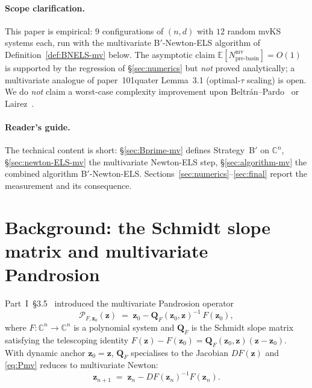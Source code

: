 \documentclass[11pt,a4paper]{article}
\begin{document}
\begin{abstract}
We do \emph{not} claim a complexity-theoretic improvement upon Beltr\'an--Pardo or Lairez (who together resolve Smale~17). The contribution is to verify empirically that the multivariate Pandrosion-Newton scheme of Part~I §3.5 attains $O(D \log D)$ on mvKS, and to clarify that this is a property of the multivariate Newton step itself, not of the ELS modification.
\end{abstract}

\paragraph{Scope clarification.} This paper is empirical: $9$ configurations of $(n, d)$ with $12$ random mvKS systems each, run with the multivariate B$'$-Newton-ELS algorithm of Definition~\ref{def:BNELS-mv} below. The asymptotic claim $\mathbb{E}[N_{\text{pre-basin}}^{\text{mv}}] = O(1)$ is supported by the regression of \S\ref{sec:numerics} but \emph{not} proved analytically; a multivariate analogue of paper~101quater Lemma~3.1 (optimal-$\tau$ scaling) is open. We do \emph{not} claim a worst-case complexity improvement upon Beltr\'an--Pardo~\cite{beltranpardo} or Lairez~\cite{lairez}.

\paragraph{Reader's guide.}
The technical content is short: \S\ref{sec:Bprime-mv} defines Strategy~B$'$ on $\mathbb{C}^n$, \S\ref{sec:newton-ELS-mv} the multivariate Newton-ELS step, \S\ref{sec:algorithm-mv} the combined algorithm B$'$-Newton-ELS. Sections~\ref{sec:numerics}--\ref{sec:final} report the measurement and its consequence.

\tableofcontents

\section{Background: the Schmidt slope matrix and multivariate Pandrosion}\label{sec:background}

Part~I~\S3.5~\cite{besevic1} introduced the multivariate Pandrosion operator
\begin{equation}\label{eq:Pmv}
\mathcal{P}_{F, \mathbf{z}_0}(\mathbf{z}) \;=\; \mathbf{z}_0 - \mathbf{Q}_F(\mathbf{z}_0, \mathbf{z})^{-1}\, F(\mathbf{z}_0),
\end{equation}
where $F: \mathbb{C}^n \to \mathbb{C}^n$ is a polynomial system and $\mathbf{Q}_F$ is the Schmidt slope matrix~\cite{schmidt1963} satisfying the telescoping identity $F(\mathbf{z}) - F(\mathbf{z}_0) = \mathbf{Q}_F(\mathbf{z}_0, \mathbf{z})(\mathbf{z} - \mathbf{z}_0)$. With dynamic anchor $\mathbf{z}_0 = \mathbf{z}$, $\mathbf{Q}_F$ specialises to the Jacobian $DF(\mathbf{z})$ and \eqref{eq:Pmv} reduces to multivariate Newton:
\begin{equation}\label{eq:Newton-mv}
\mathbf{z}_{n+1} \;=\; \mathbf{z}_n - DF(\mathbf{z}_n)^{-1} F(\mathbf{z}_n).
\end{equation}
\end{document}
